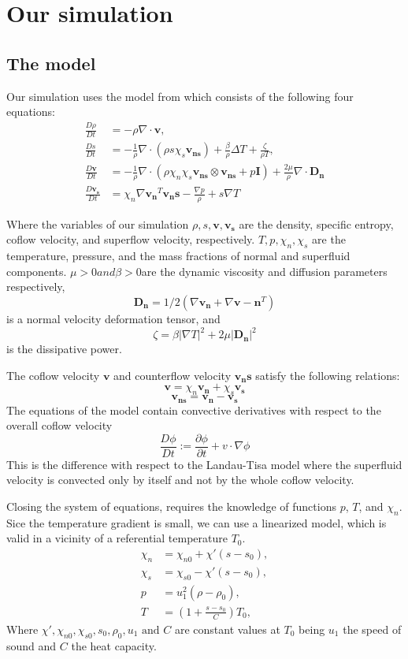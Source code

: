 \documentclass{article}
\begin{document}
\section{Our simulation}
\subsection{The model}
Our simulation uses the model from\cite{Kincl} which consists of the following four equations:
\begin{align}
\frac{D\rho}{Dt} &= -\rho \nabla \cdot \mathbf{v}, \\
\frac{Ds}{Dt} &= -\frac{1}{\rho} \nabla \cdot (\rho s \chi_s \mathbf{v_{ns}}) + \frac{\beta}{\rho} \Delta T + \frac{\zeta}{\rho T} ,\\
\frac{D\mathbf{v}}{Dt} &= -\frac{1}{\rho} \nabla \cdot (\rho \chi_n \chi_s \mathbf{v_{ns}} \otimes \mathbf{v_{ns}} + p \mathbf{I}) + \frac{2 \mu}{\rho} \nabla \cdot \mathbf{D_n} \\
\frac{D\mathbf{v_s}}{Dt} &= \chi_n \nabla \mathbf{v_n}^T \mathbf{v_ns} - \frac{\nabla p}{\rho} + s \nabla T
\end{align}

Where the variables of our simulation  \(\rho, s, \mathbf{v}, \mathbf{v_s}\) are the density, specific entropy, coflow velocity, and superflow velocity, respectively.
\(T, p, \chi_n, \chi_s\) are the temperature, pressure, and the mass fractions of normal and superfluid components. 
\(\mu > 0 and \beta>0 \)are the dynamic viscosity and diffusion parameters respectively, 
\[\mathbf{D_n} = 1/2(\nabla \mathbf{v_n} +  \nabla \mathbf{v-n}^T)\] 
is a normal velocity deformation tensor, and
\[\zeta = \beta |\nabla T|^2 + 2 \mu |\mathbf{D_n}|^2\]
is the dissipative power.


The coflow velocity \(\mathbf{v}\) and counterflow velocity \( \mathbf{v_ns}\) satisfy the following relations:
\[\mathbf{v} = \chi_n \mathbf{v_n} + \chi_s \mathbf{v_s}\]
\[\mathbf{v_{ns}}  = \mathbf{v_n} - \mathbf{v_s}\]
The equations of the model contain convective derivatives with respect to the overall coflow velocity
\[\frac{D\phi}{Dt} := \frac{\partial \phi}{\partial t} + v \cdot \nabla \phi\]
This is the difference with respect to the Landau-Tisa model where the superfluid velocity is convected only by itself and not by the whole coflow velocity.

Closing the system of equations, requires the knowledge of functions \(p\), \(T\), and \(\chi_n\).
Sice the temperature gradient is small, we can use a linearized model, which is valid in a vicinity of a referential temperature \(T_0\).
\begin{align}
    \chi_n &= \chi_{n0} + \chi'(s-s_0),\\
    \chi_s &= \chi_{s0} - \chi'(s-s_0),\\
    p &= u_1^2(\rho-\rho_0), \\
    T &= (1+\frac{s-s_0}{C})T_0,
\end{align}
Where \(\chi', \chi_{n0}, \chi_{s0}, s_0, \rho_0, u_1 \text{ and } C\) are constant values at \(T_0\) being 
\(u_1\) the speed of sound and \(C\) the heat capacity. 
\end{document}
